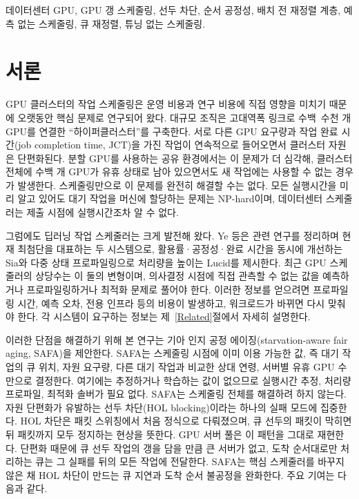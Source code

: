 \documentclass{ieeetj}
\begin{document}
\begin{IEEEkeywords}
데이터센터 GPU, GPU 갱 스케줄링, 선두 차단, 순서 공정성, 배치 전 재정렬 계층, 예측 없는 스케줄링, 큐 재정렬, 튜닝 없는 스케줄링.
\end{IEEEkeywords}

\maketitle


\section{서론}\label{sec1}
GPU 클러스터의 작업 스케줄링은 운영 비용과 연구 비용에 직접 영향을 미치기 때문에 오랫동안 핵심 문제로 연구되어 왔다. 대규모 조직은 고대역폭 링크로 수백~수천 개 GPU를 연결한 ``하이퍼클러스터''를 구축한다. 서로 다른 GPU 요구량과 작업 완료 시간(job completion time, JCT)을 가진 작업이 연속적으로 들어오면서 클러스터 자원은 단편화된다\cite{athlur2022varuna}. 분할 GPU를 사용하는 공유 환경에서는 이 문제가 더 심각해, 클러스터 전체에 수백 개 GPU가 유휴 상태로 남아 있으면서도 새 작업에는 사용할 수 없는 경우가 발생한다\cite{weng2023beware}. 스케줄링만으로 이 문제를 완전히 해결할 수는 없다. 모든 실행시간을 미리 알고 있어도 대기 작업을 머신에 할당하는 문제는 NP-hard이며\cite{ullman1975np,b1}, 데이터센터 스케줄러는 제출 시점에 실행시간조차 알 수 없다\cite{b2}.

그럼에도 딥러닝 작업 스케줄러는 크게 발전해 왔다. Ye 등\cite{b3}은 관련 연구를 정리하며 현재 최첨단을 대표하는 두 시스템으로, 활용률·공정성·완료 시간을 동시에 개선하는 Sia\cite{b4}와 다중 상태 프로파일링으로 처리량을 높이는 Lucid\cite{b5}를 제시한다. 최근 GPU 스케줄러의 상당수는 이 둘의 변형이며, 의사결정 시점에 직접 관측할 수 없는 값을 예측하거나 프로파일링하거나 최적화 문제로 풀어야 한다. 이러한 정보를 얻으려면 프로파일링 시간, 예측 오차, 전용 인프라 등의 비용이 발생하고, 워크로드가 바뀌면 다시 맞춰야 한다. 각 시스템이 요구하는 정보는 제~\ref{Related}절에서 자세히 설명한다.

이러한 단점을 해결하기 위해 본 연구는 기아 인지 공정 에이징(starvation-aware fair aging, SAFA)을 제안한다. SAFA는 스케줄링 시점에 이미 이용 가능한 값, 즉 대기 작업의 큐 위치, 자원 요구량, 다른 대기 작업과 비교한 상대 연령, 서버별 유휴 GPU 수만으로 결정한다. 여기에는 추정하거나 학습하는 값이 없으므로 실행시간 추정, 처리량 프로파일, 최적화 솔버가 필요 없다. SAFA는 스케줄링 전체를 해결하려 하지 않는다. 자원 단편화가 유발하는 선두 차단(HOL blocking)\cite{karol1987hol}이라는 하나의 실패 모드에 집중한다. HOL 차단은 패킷 스위칭에서 처음 정식으로 다뤄졌으며, 큐 선두의 패킷이 막히면 뒤 패킷까지 모두 정지하는 현상을 뜻한다. GPU 서버 풀은 이 패턴을 그대로 재현한다. 단편화 때문에 큐 선두 작업의 갱을 담을 만큼 큰 서버가 없고, 도착 순서대로만 처리하는 큐는 그 실패를 뒤의 모든 작업에 전달한다. SAFA는 핵심 스케줄러를 바꾸지 않은 채 HOL 차단이 만드는 큐 지연과 도착 순서 불공정을 완화한다. 주요 기여는 다음과 같다.
\end{document}
